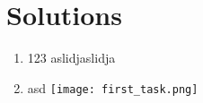 \documentclass{article}
\begin{document}

\section*{Solutions}
\begin{enumerate}
        \item 123
 aslidjaslidja
        \item asd \makebox[0pt][l]{}
        \texttt{[image: first\_task.png]}
\end{enumerate}
\end{document}
